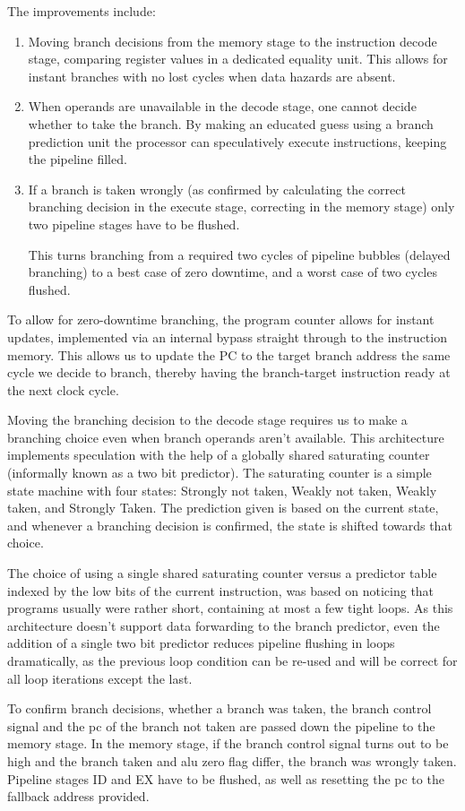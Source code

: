 The improvements include:
\begin{enumerate}
  \item
    Moving branch decisions from the memory stage to the instruction decode stage, comparing register values in a dedicated equality unit.
    This allows for instant branches with no lost cycles when data hazards are absent.
  \item
    When operands are unavailable in the decode stage, one cannot decide whether to take the branch.
    By making an educated guess using a branch prediction unit the processor can speculatively execute instructions, keeping the pipeline filled.
  \item
    If a branch is taken wrongly (as confirmed by calculating the correct branching decision in the execute stage, correcting in the memory stage) only two pipeline stages have to be flushed.

    This turns branching from a required two cycles of pipeline bubbles (delayed branching) to a best case of zero downtime, and a worst case of two cycles flushed.
\end{enumerate}

To allow for zero-downtime branching, the program counter allows for instant updates, implemented via an internal bypass straight through to the instruction memory.
This allows us to update the PC to the target branch address the same cycle we decide to branch, thereby having the branch-target instruction ready at the next clock cycle.

Moving the branching decision to the decode stage requires us to make a branching choice even when branch operands aren't available.
This architecture implements speculation with the help of a globally shared saturating counter (informally known as a two bit predictor).
The saturating counter is a simple state machine with four states: Strongly not taken, Weakly not taken, Weakly taken, and Strongly Taken.
The prediction given is based on the current state, and whenever a branching decision is confirmed, the state is shifted towards that choice.

The choice of using a single shared saturating counter versus a predictor table indexed by the low bits of the current instruction, was based on noticing that programs usually were rather short, containing at most a few tight loops.
As this architecture doesn't support data forwarding to the branch predictor, even the addition of a single two bit predictor reduces pipeline flushing in loops dramatically, as the previous loop condition can be re-used and will be correct for all loop iterations except the last.

To confirm branch decisions, whether a branch was taken, the branch control signal and the pc of the branch not taken are passed down the pipeline to the memory stage.
In the memory stage, if the branch control signal turns out to be high and the branch taken and alu zero flag differ, the branch was wrongly taken.
Pipeline stages ID and EX have to be flushed, as well as resetting the pc to the fallback address provided.
